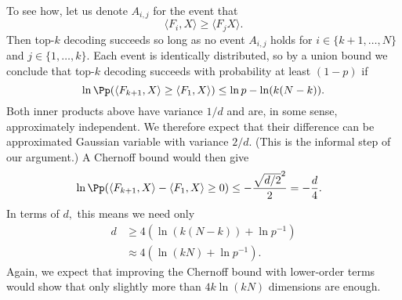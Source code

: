 To see how, let us denote $A_{i, j}$ for the event that
$$
	\langle F_i, X \rangle \ge \langle F_j X \rangle.
$$
Then top-$k$ decoding succeeds so long as no event $A_{i, j}$ holds for $i \in \{ k + 1, \dots, N \}$ and $j \in \{ 1, \dots, k \}.$ Each event is identically distributed, so by a union bound we conclude that top-$k$ decoding succeeds with probability at least $(1 - p)$ if
$$
	\ln \Pp(\langle F_{k + 1}, X \rangle \ge \langle F_1, X\rangle) \le \ln p - \ln(k(N - k)).
$$
Both inner products above have variance $1/d$ and are, in some sense, approximately independent. We therefore expect that their difference can be approximated Gaussian variable with variance $2/d.$ (This is the informal step of our argument.) A Chernoff bound would then give
\begin{align*}
	 & \ln \Pp(\langle F_{k + 1}, X \rangle - \langle F_1, X \rangle \ge 0) \le -\frac {\sqrt{d/2}^2}{2} = - \frac{d}{4}.
\end{align*}
In terms of $d,$ this means we need only
\begin{align*}
	d & \ge 4 (\ln(k(N - k)) + \ln p^{-1}) \\
	  & \approx 4 (\ln(kN) + \ln p^{-1}).
\end{align*}
Again, we expect that improving the Chernoff bound with lower-order terms would show that only slightly more than $4 k \ln(k N)$ dimensions are enough.
